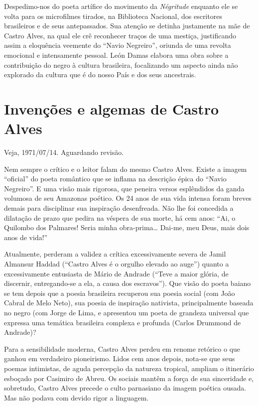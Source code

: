 \documentclass[
  letterpaper,
  DIV=11,
  numbers=noendperiod]{scrreprt}
\begin{document}
Despedimo-nos do poeta artífice do movimento da \emph{Négritude}
enquanto ele se volta para os microfilmes tirados, na Biblioteca
Nacional, dos escritores brasileiros e de seus antepassados. Sua atenção
se detinha justamente na mãe de Castro Alves, na qual ele crê reconhecer
traços de uma mestiça, justificando assim a eloquência veemente do
``Navio Negreiro'', oriunda de uma revolta emocional e intensamente
pessoal. León Damas elabora uma obra sobre a contribuição do negro à
cultura brasileira, focalizando um aspecto ainda não explorado da
cultura que é do nosso País e dos seus ancestrais.

\chapter{Invenções e algemas de Castro
Alves}\label{invenuxe7uxf5es-e-algemas-de-castro-alves}

Veja, 1971/07/14. Aguardando revisão.

\hfill\break

Nem sempre o crítico e o leitor falam do mesmo Castro Alves. Existe a
imagem ``oficial'' do poeta romântico que se inflama na descrição épica
do ``Navio Negreiro''. E uma visão mais rigorosa, que peneira versos
esplêndidos da ganda volumosa de seu Amazonas poético. Os 24 anos de sua
vida intensa foram breves demais para disciplinar sua inspiração
desenfreada. Não lhe foi concedida a dilatação de prazo que pedira na
véspera de sua morte, há cem anos: ``Ai, o Quilombo dos Palmares! Seria
minha obra-prima\ldots{} Dai-me, meu Deus, mais dois anos de vida!''

Atualmente, perderam a validez a crítica excessivamente severa de Jamil
Almansur Haddad (``Castro Alves é o orgulho elevado ao auge'') quanto a
excessivamente entusiasta de Mário de Andrade (``Teve a maior glória, de
discernir, entregando-se a ela, a causa dos escravos''). Que visão do
poeta baiano se tem depois que a poesia brasileira recuperou sua poesia
social (com João Cabral de Melo Neto), sua poesia de inspiração
nativista, principalmente baseada no negro (com Jorge de Lima, e
apresentou um poeta de grandeza universal que expressa uma temática
brasileira complexa e profunda (Carlos Drummond de Andrade)?

Para a sensibilidade moderna, Castro Alves perdeu em renome retórico o
que ganhou em verdadeiro pioneirismo. Lidos cem anos depois, nota-se que
seus poemas intimistas, de aguda percepção da natureza tropical, ampliam
o itinerário esboçado por Casimiro de Abreu. Os sociais mantêm a força
de sua sinceridade e, sobretudo, Castro Alves precede o culto parnasiano
da imagem poética ousada. Mas não podava com devido rigor a linguagem.
\end{document}
